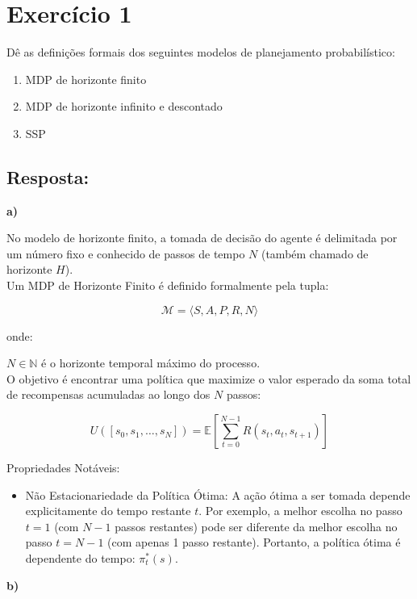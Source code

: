 \documentclass[a4paper,12pt]{article}
\begin{document}
\section*{Exercício 1}

Dê as definições formais dos seguintes modelos de planejamento probabilístico:

\begin{enumerate}[label=\alph*)]
	\item MDP de horizonte finito
	\item MDP de horizonte infinito e descontado
	\item SSP
\end{enumerate}

\subsection*{Resposta:}

\bigskip

\textbf{a)} 

No modelo de horizonte finito, a tomada de decisão do agente é delimitada por um número fixo e conhecido de passos de tempo $N$ (também chamado de horizonte $H$).\\

Um MDP de Horizonte Finito é definido formalmente pela tupla:

$$\mathcal{M} = \langle S, A, P, R, N \rangle$$

onde:

$N \in \mathbb{N}$ é o horizonte temporal máximo do processo.\\

O objetivo é encontrar uma política que maximize o valor esperado da soma total de recompensas acumuladas ao longo dos $N$ passos:

$$U([s_0, s_1, \dots, s_N]) = \mathbb{E} \left[ \sum_{t=0}^{N-1} R(s_t, a_t, s_{t+1}) \right]$$

Propriedades Notáveis:
\begin{itemize}
	\item Não Estacionariedade da Política Ótima: A ação ótima a ser tomada depende explicitamente do tempo restante $t$. Por exemplo, a melhor escolha no passo $t=1$ (com $N-1$ passos restantes) pode ser diferente da melhor escolha no passo $t=N-1$ (com apenas 1 passo restante). Portanto, a política ótima é dependente do tempo: $\pi_t^*(s)$.
\end{itemize}

\bigskip

\textbf{b)}
\end{document}
